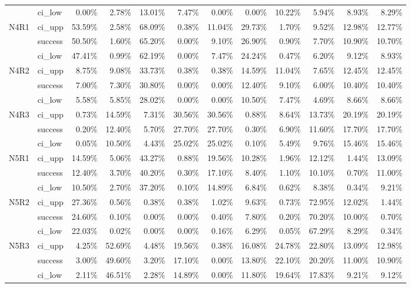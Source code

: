 \begin{tabular}{llrrrrrrrrrr}
     & ci\_low &       0.00\% &  2.78\% & 13.01\% &  7.47\% &  0.00\% &        0.00\% & 10.22\% &  5.94\% &  8.93\% &  8.29\% \\
N4R1 & ci\_upp &      53.59\% &  2.58\% & 68.09\% &  0.38\% & 11.04\% &       29.73\% &  1.70\% &  9.52\% & 12.98\% & 12.77\% \\
     & success &      50.50\% &  1.60\% & 65.20\% &  0.00\% &  9.10\% &       26.90\% &  0.90\% &  7.70\% & 10.90\% & 10.70\% \\
     & ci\_low &      47.41\% &  0.99\% & 62.19\% &  0.00\% &  7.47\% &       24.24\% &  0.47\% &  6.20\% &  9.12\% &  8.93\% \\
N4R2 & ci\_upp &       8.75\% &  9.08\% & 33.73\% &  0.38\% &  0.38\% &       14.59\% & 11.04\% &  7.65\% & 12.45\% & 12.45\% \\
     & success &       7.00\% &  7.30\% & 30.80\% &  0.00\% &  0.00\% &       12.40\% &  9.10\% &  6.00\% & 10.40\% & 10.40\% \\
     & ci\_low &       5.58\% &  5.85\% & 28.02\% &  0.00\% &  0.00\% &       10.50\% &  7.47\% &  4.69\% &  8.66\% &  8.66\% \\
N4R3 & ci\_upp &       0.73\% & 14.59\% &  7.31\% & 30.56\% & 30.56\% &        0.88\% &  8.64\% & 13.73\% & 20.19\% & 20.19\% \\
     & success &       0.20\% & 12.40\% &  5.70\% & 27.70\% & 27.70\% &        0.30\% &  6.90\% & 11.60\% & 17.70\% & 17.70\% \\
     & ci\_low &       0.05\% & 10.50\% &  4.43\% & 25.02\% & 25.02\% &        0.10\% &  5.49\% &  9.76\% & 15.46\% & 15.46\% \\
N5R1 & ci\_upp &      14.59\% &  5.06\% & 43.27\% &  0.88\% & 19.56\% &       10.28\% &  1.96\% & 12.12\% &  1.44\% & 13.09\% \\
     & success &      12.40\% &  3.70\% & 40.20\% &  0.30\% & 17.10\% &        8.40\% &  1.10\% & 10.10\% &  0.70\% & 11.00\% \\
     & ci\_low &      10.50\% &  2.70\% & 37.20\% &  0.10\% & 14.89\% &        6.84\% &  0.62\% &  8.38\% &  0.34\% &  9.21\% \\
N5R2 & ci\_upp &      27.36\% &  0.56\% &  0.38\% &  0.38\% &  1.02\% &        9.63\% &  0.73\% & 72.95\% & 12.02\% &  1.44\% \\
     & success &      24.60\% &  0.10\% &  0.00\% &  0.00\% &  0.40\% &        7.80\% &  0.20\% & 70.20\% & 10.00\% &  0.70\% \\
     & ci\_low &      22.03\% &  0.02\% &  0.00\% &  0.00\% &  0.16\% &        6.29\% &  0.05\% & 67.29\% &  8.29\% &  0.34\% \\
N5R3 & ci\_upp &       4.25\% & 52.69\% &  4.48\% & 19.56\% &  0.38\% &       16.08\% & 24.78\% & 22.80\% & 13.09\% & 12.98\% \\
     & success &       3.00\% & 49.60\% &  3.20\% & 17.10\% &  0.00\% &       13.80\% & 22.10\% & 20.20\% & 11.00\% & 10.90\% \\
     & ci\_low &       2.11\% & 46.51\% &  2.28\% & 14.89\% &  0.00\% &       11.80\% & 19.64\% & 17.83\% &  9.21\% &  9.12\% \\
\bottomrule
\end{tabular}

